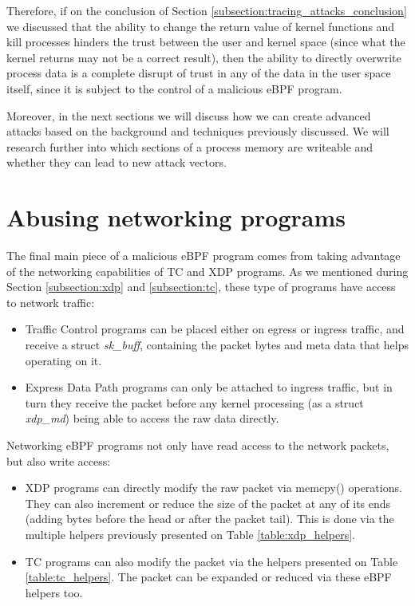 Therefore, if on the conclusion of Section \ref{subsection:tracing_attacks_conclusion} we discussed that the ability to change the return value of kernel functions and kill processes hinders the trust between the user and kernel space (since what the kernel returns may not be a correct result), then the ability to directly overwrite process data is a complete disrupt of trust in any of the data in the user space itself, since it is subject to the control of a malicious eBPF program.

Moreover, in the next sections we will discuss how we can create advanced attacks based on the background and techniques previously discussed. We will research further into which sections of a process memory are writeable and whether they can lead to new attack vectors.


\section{Abusing networking programs}\label{section:abusing_networking}
The final main piece of a malicious eBPF program comes from taking advantage of the networking capabilities of TC and XDP programs. As we mentioned during Section \ref{subsection:xdp} and \ref{subsection:tc}, these type of programs have access to network traffic:
\begin{itemize}
\item Traffic Control programs can be placed either on egress or ingress traffic, and receive a struct \textit{sk\_buff}, containing the packet bytes and meta data that helps operating on it.
\item Express Data Path programs can only be attached to ingress traffic, but in turn they receive the packet before any kernel processing (as a struct \textit{xdp\_md}) being able to access the raw data directly.
\end{itemize}

Networking eBPF programs not only have read access to the network packets, but also write access:
\begin{itemize}
\item XDP programs can directly modify the raw packet via memcpy() operations. They can also increment or reduce the size of the packet at any of its ends (adding bytes before the head or after the packet tail). This is done via the multiple helpers previously presented on Table \ref{table:xdp_helpers}.
\item TC programs can also modify the packet via the helpers presented on Table \ref{table:tc_helpers}. The packet can be expanded or reduced via these eBPF helpers too.
\end{itemize} 

